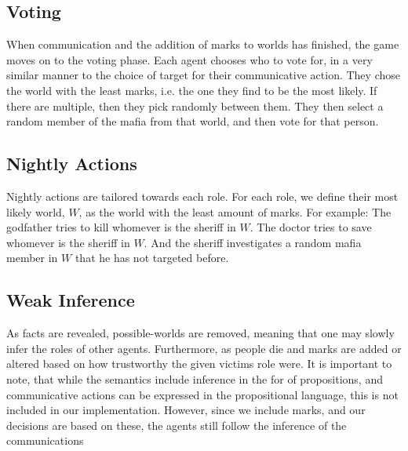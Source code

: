 \subsection{Voting}\label{Voting}
When communication and the addition of marks to worlds has finished, the game moves on to
the voting phase. Each agent chooses who to vote for, in a very similar manner
to the choice of target for their communicative action. They chose the world
with the least marks, i.e. the one they find to be the most likely. If there
are multiple, then they pick randomly between them. They then select a random
member of the mafia from that world, and then vote for that person.
\subsection{Nightly Actions}\label{NightlyActions}
Nightly actions are tailored towards each role. For each role, we define their most likely world, $W$, as the world with the least amount of marks. For example: The
godfather tries to kill whomever is the sheriff in $W$. The doctor tries to save whomever is the sheriff in $W$. And the sheriff investigates a random mafia member in $W$ that he has not targeted before. 
\subsection{Weak Inference}\label{WeakInference}
As facts are revealed, possible-worlds are removed,
meaning that one may slowly infer the roles of other agents. Furthermore, as people die and marks are added or altered based on
how trustworthy the given victims role were. It is important to note, that while the semantics include inference in the for of propositions, and communicative actions can be expressed in the propositional language, this is not included in our implementation. However, since we include marks, and our decisions are based on these, the agents still follow the inference of the communications
